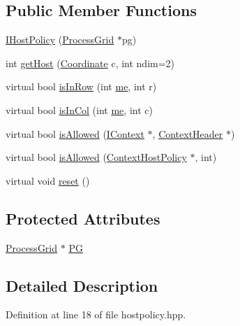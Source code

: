 \subsection*{Public Member Functions}
\begin{DoxyCompactItemize}
\item 
\hyperlink{class_i_host_policy_a828c447a8f9e985e22d04a0bd933f5d6}{IHostPolicy} (\hyperlink{class_process_grid}{ProcessGrid} $\ast$pg)
\item 
int \hyperlink{class_i_host_policy_ab759310a417532f33b513fbe1ac6aea8}{getHost} (\hyperlink{class_coordinate}{Coordinate} c, int ndim=2)
\item 
virtual bool \hyperlink{class_i_host_policy_aed5e7b81736d6e950897a8e341cc9a2c}{isInRow} (int \hyperlink{mpi__comm_8hpp_a94bbc6e3d7712df24be96e5e83d0aaf8}{me}, int r)
\item 
virtual bool \hyperlink{class_i_host_policy_ac886a2d16e0914619ba9423f697c5e1a}{isInCol} (int \hyperlink{mpi__comm_8hpp_a94bbc6e3d7712df24be96e5e83d0aaf8}{me}, int c)
\item 
virtual bool \hyperlink{class_i_host_policy_a5200e3143a640e492438361a3fd2626a}{isAllowed} (\hyperlink{class_i_context}{IContext} $\ast$, \hyperlink{class_context_header}{ContextHeader} $\ast$)
\item 
virtual bool \hyperlink{class_i_host_policy_ad7665cb96e008e8f189201662ae32736}{isAllowed} (\hyperlink{class_context_host_policy}{ContextHostPolicy} $\ast$, int)
\item 
virtual void \hyperlink{class_i_host_policy_a76602bc70073ed8eb476d9ddacdef74f}{reset} ()
\end{DoxyCompactItemize}
\subsection*{Protected Attributes}
\begin{DoxyCompactItemize}
\item 
\hyperlink{class_process_grid}{ProcessGrid} $\ast$ \hyperlink{class_i_host_policy_a8e93dcd6f13d6ad65da75ddf2837174f}{PG}
\end{DoxyCompactItemize}


\subsection{Detailed Description}


Definition at line 18 of file hostpolicy.hpp.

